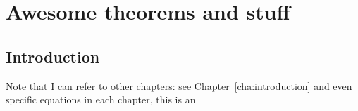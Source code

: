 
\chapter{Awesome theorems and stuff}\label{cha:awesome_theorems_and_stuff}

\section{Introduction}

Note that I can refer to other chapters: see Chapter~\ref{cha:introduction} and
even specific equations in each chapter, this is an



